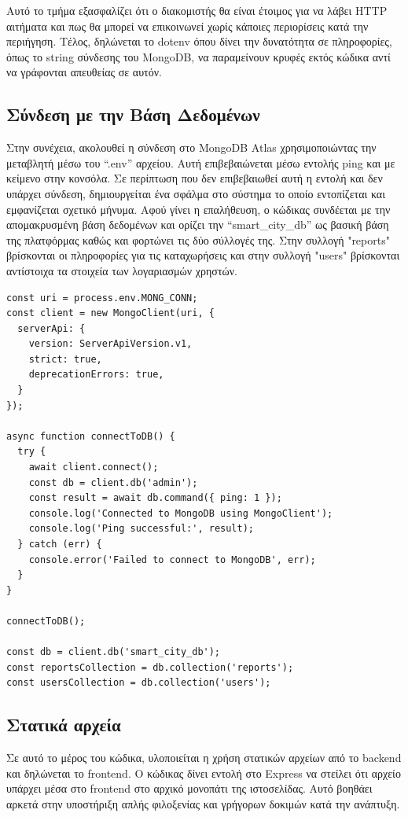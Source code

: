 Αυτό το τμήμα εξασφαλίζει ότι ο διακομιστής θα είναι έτοιμος για να λάβει HTTP αιτήματα και πως θα μπορεί να επικοινωνεί χωρίς κάποιες περιορίσεις κατά την περιήγηση. Τέλος, δηλώνεται το dotenv όπου δίνει την δυνατότητα σε πληροφορίες, όπως το string σύνδεσης του MongoDB, να παραμείνουν κρυφές εκτός κώδικα αντί να γράφονται απευθείας σε αυτόν.
\\
\subsection{Σύνδεση με την Βάση Δεδομένων}
Στην συνέχεια, ακολουθεί η σύνδεση στο MongoDB Atlas χρησιμοποιώντας την μεταβλητή μέσω του “.env” αρχείου. Αυτή επιβεβαιώνεται μέσω εντολής ping και με κείμενο στην κονσόλα. Σε περίπτωση που δεν επιβεβαιωθεί αυτή η εντολή και δεν υπάρχει σύνδεση, δημιουργείται ένα σφάλμα στο σύστημα το οποίο εντοπίζεται και εμφανίζεται σχετικό μήνυμα. Αφού γίνει η επαλήθευση, ο κώδικας συνδέεται με την απομακρυσμένη βάση δεδομένων και ορίζει την “smart\_city\_db” ως βασική βάση της πλατφόρμας καθώς και φορτώνει τις δύο σύλλογές της. Στην συλλογή "reports" βρίσκονται οι πληροφορίες για τις καταχωρήσεις και στην συλλογή "users" βρίσκονται αντίστοιχα τα στοιχεία των λογαριασμών χρηστών.
\\

\begin{lstlisting}
const uri = process.env.MONG_CONN;
const client = new MongoClient(uri, {
  serverApi: {
    version: ServerApiVersion.v1,
    strict: true,
    deprecationErrors: true,
  }
});

async function connectToDB() {
  try {
    await client.connect();
    const db = client.db('admin');
    const result = await db.command({ ping: 1 });
    console.log('Connected to MongoDB using MongoClient');
    console.log('Ping successful:', result);
  } catch (err) {
    console.error('Failed to connect to MongoDB', err);
  }
}

connectToDB();

const db = client.db('smart_city_db');
const reportsCollection = db.collection('reports');
const usersCollection = db.collection('users');
\end{lstlisting}

\subsection{Στατικά αρχεία}
Σε αυτό το μέρος του κώδικα, υλοποιείται η χρήση στατικών αρχείων από το backend και δηλώνεται το frontend. Ο κώδικας δίνει εντολή στο Express να στείλει ότι αρχείο υπάρχει μέσα στο frontend στο αρχικό μονοπάτι της ιστοσελίδας. Αυτό βοηθάει αρκετά στην υποστήριξη απλής φιλοξενίας και γρήγορων δοκιμών κατά την ανάπτυξη.
\\

